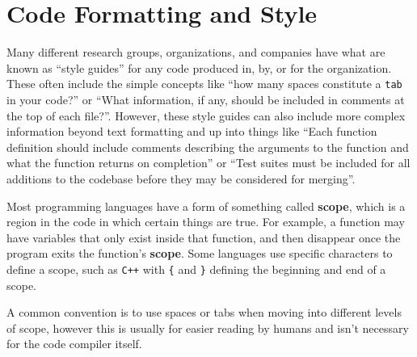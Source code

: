 \section{Code Formatting and Style}
Many different research groups, organizations, and companies have what
are known as ``style guides'' for any code produced in, by, or for the
organization. These often include the simple concepts like ``how many
spaces constitute a \texttt{tab} in your code?'' or ``What information,
if any, should be included in comments at the top of each file?''.
However, these style guides can also include more complex information
beyond text formatting and up into things like ``Each function
definition should include comments describing the arguments to the
function and what the function returns on completion'' or ``Test suites
must be included for all additions to the codebase before they may be
considered for merging''.

Most programming languages have a form of something called
\textbf{scope}, which is a region in the code in which certain things
are true. For example, a function may have variables that only exist
inside that function, and then disappear once the program exits the
function's \textbf{scope}. Some languages use specific characters to
define a scope, such as \texttt{C++} with \texttt{\{} and \texttt{\}}
defining the beginning and end of a scope.

\begin{Shaded}
\begin{Highlighting}[]
\OperatorTok{()}
\OperatorTok{\{}
\OperatorTok{\textless{}\textless{}} \OperatorTok{;}
     \OperatorTok{(} \OperatorTok{\textless{}} \OperatorTok{)}
    \OperatorTok{\{}
\OperatorTok{\textless{}\textless{}} \OperatorTok{;}
    \OperatorTok{\}}
    \OperatorTok{;}
\OperatorTok{\}}
\end{Highlighting}
\end{Shaded}

A common convention is to use spaces or tabs when moving into different
levels of scope, however this is usually for easier reading by humans
and isn't necessary for the code compiler itself.

